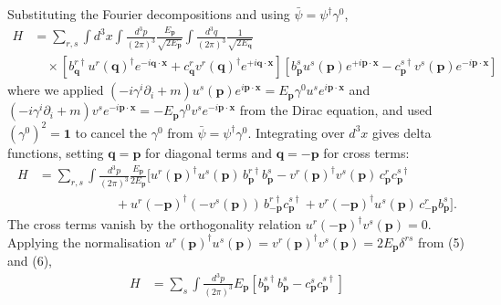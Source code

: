 \begin{solution}
    Substituting the Fourier decompositions and using $\bar\psi = \psi^\dagger\gamma^0$,
    \begin{equation}
    \begin{aligned}
        H &= \sum_{r,s}\int d^3x\int\frac{d^3p}{(2\pi)^3}\frac{E_\mathbf{p}}{\sqrt{2E_\mathbf{p}}}\int\frac{d^3q}{(2\pi)^3}\frac{1}{\sqrt{2E_\mathbf{q}}}\\
        &\quad\times\left[b^{r\dagger}_\mathbf{q} u^r(\mathbf{q})^\dagger e^{-i\mathbf{q}\cdot\mathbf{x}} + c^r_\mathbf{q} v^r(\mathbf{q})^\dagger e^{+i\mathbf{q}\cdot\mathbf{x}}\right]\left[b^s_\mathbf{p} u^s(\mathbf{p})e^{+i\mathbf{p}\cdot\mathbf{x}} - c^{s\dagger}_\mathbf{p} v^s(\mathbf{p})e^{-i\mathbf{p}\cdot\mathbf{x}}\right]
    \end{aligned}
    \end{equation}
    where we applied $(-i\gamma^i\partial_i + m)u^s(\mathbf{p})e^{i\mathbf{p}\cdot\mathbf{x}} = E_\mathbf{p}\gamma^0 u^s e^{i\mathbf{p}\cdot\mathbf{x}}$ and $(-i\gamma^i\partial_i+m)v^s e^{-i\mathbf{p}\cdot\mathbf{x}} = -E_\mathbf{p}\gamma^0 v^s e^{-i\mathbf{p}\cdot\mathbf{x}}$ from the Dirac equation, and used $(\gamma^0)^2 = \mathbf{1}$ to cancel the $\gamma^0$ from $\bar\psi = \psi^\dagger\gamma^0$. Integrating over $d^3x$ gives delta functions, setting $\mathbf{q}=\mathbf{p}$ for diagonal terms and $\mathbf{q}=-\mathbf{p}$ for cross terms:
    \begin{equation}
    \begin{aligned}
        H &= \sum_{r,s}\int\frac{d^3p}{(2\pi)^3}\frac{E_\mathbf{p}}{2E_\mathbf{p}}\bigg[u^r(\mathbf{p})^\dagger u^s(\mathbf{p})\,b^{r\dagger}_\mathbf{p} b^s_\mathbf{p} - v^r(\mathbf{p})^\dagger v^s(\mathbf{p})\,c^r_\mathbf{p} c^{s\dagger}_\mathbf{p}\\
        &\qquad\qquad\qquad + u^r(-\mathbf{p})^\dagger(-v^s(\mathbf{p}))\,b^{r\dagger}_{-\mathbf{p}}c^{s\dagger}_\mathbf{p} + v^r(-\mathbf{p})^\dagger u^s(\mathbf{p})\,c^r_{-\mathbf{p}}b^s_\mathbf{p}\bigg].
    \end{aligned}
    \end{equation}
    The cross terms vanish by the orthogonality relation $u^r(-\mathbf{p})^\dagger v^s(\mathbf{p}) = 0$. Applying the normalisation $u^r(\mathbf{p})^\dagger u^s(\mathbf{p}) = v^r(\mathbf{p})^\dagger v^s(\mathbf{p}) = 2E_\mathbf{p}\delta^{rs}$ from (5) and (6),
    \begin{equation}
    \begin{aligned}
        H &= \sum_s\int\frac{d^3p}{(2\pi)^3}E_\mathbf{p}\left[b^{s\dagger}_\mathbf{p} b^s_\mathbf{p} - c^s_\mathbf{p} c^{s\dagger}_\mathbf{p}\right]\\

\end{aligned}
\end{equation}
\end{solution}
